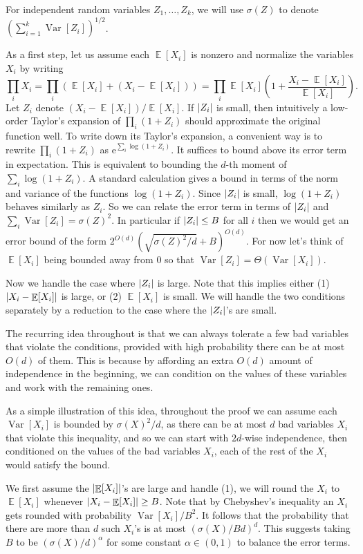 \documentclass[11pt]{article}
\numberwithin{equation}{section}
\theoremstyle{definition}
\theoremstyle{plain}
\newcommand{\eee}{\mathrm e}
\DeclarePairedDelimiter{\abs}{\lvert}{\rvert}
\DeclareMathOperator*{\E}{\mathbb{E}}                 %
\DeclareMathOperator*{\Var}{Var}                 %
\begin{document}
  For independent random variables $Z_1, \ldots, Z_k$, we will use $\sigma(Z)$ to denote $(\sum_{i = 1}^k \Var[Z_i])^{1/2}$.

  As a first step, let us assume each $\E[X_i]$ is nonzero and normalize the variables $X_i$ by writing
  \[
    \prod_i X_i
    = \prod_i (\E[X_i] + (X_i - \E[X_i]))
    = \prod_i \E[X_i] \left( 1 + \frac{X_i - \E[X_i]}{\E[X_i]} \right) .
  \]
  Let $Z_i$ denote $(X_i - \E[X_i]) / \E[X_i]$.
  If $\abs{Z_i}$ is small, then intuitively a low-order Taylor's expansion of $\prod_i (1 + Z_i)$ should approximate the original function well.
  To write down its Taylor's expansion, a convenient way is to rewrite $\prod_i (1 + Z_i)$ as $\eee^{\sum_i \log(1 + Z_i)}$.
  It suffices to bound above its error term in expectation.
  This is equivalent to bounding the $d$-th moment of $\sum_i \log(1 + Z_i)$.
  A standard calculation gives a bound in terms of the norm and variance of the functions $\log(1 + Z_i)$.
  Since $\abs{Z_i}$ is small, $\log(1 + Z_i)$ behaves similarly as $Z_i$.
  So we can relate the error term in terms of $\abs{Z_i}$ and $\sum_i \Var[Z_i] = \sigma(Z)^2$.
  In particular if $\abs{Z_i} \le B$ for all $i$ then we would get an error bound of the form $2^{O(d)} (\sqrt{\sigma(Z)^2 / d} + B)^{O(d)}$.
  For now let's think of $\E[X_i]$ being bounded away from $0$ so that $\Var[Z_i] = \Theta(\Var[X_i])$.

  Now we handle the case where $\abs{Z_i}$ is large.
  Note that this implies either (1) $\abs{X_i - \E[X_i]}$ is large, or (2) $\E[X_i]$ is small.
  We will handle the two conditions separately by a reduction to the case where the $\abs{Z_i}$'s are small.

  The recurring idea throughout is that we can always tolerate a few bad variables that violate the conditions, provided with high probability there can be at most $O(d)$ of them.
  This is because by affording an extra $O(d)$ amount of independence in the beginning, we can condition on the values of these variables and work with the remaining ones.

  As a simple illustration of this idea, throughout the proof we can assume each $\Var[X_i]$ is bounded by $\sigma(X)^2/d$, as there can be at most $d$ bad variables $X_i$ that violate this inequality, and so we can start with $2d$-wise independence, then conditioned on the values of the bad variables $X_i$, each of the rest of the $X_i$ would satisfy the bound.

  We first assume the $\abs{\E[X_i]}$'s are large and handle (1), we will round the $X_i$ to $\E[X_i]$ whenever $\abs{X_i - \E[X_i]} \ge B$.
  Note that by Chebyshev's inequality an $X_i$ gets rounded with probability $\Var[X_i]/B^2$.
  It follows that the probability that there are more than $d$ such $X_i$'s is at most $(\sigma(X) / B d)^d$.
  This suggests taking $B$ to be $(\sigma(X)/d)^\alpha$ for some constant $\alpha \in (0, 1)$ to balance the error terms.
\end{document}

